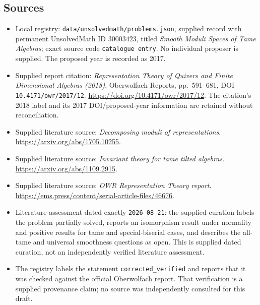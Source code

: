 \documentclass[11pt]{article}
\begin{document}
\subsection{Sources}
\begin{itemize}
\item Local registry: \texttt{data/unsolvedmath/problems.json}, supplied record with permanent UnsolvedMath ID \(30003423\), titled \emph{Smooth Moduli Spaces of Tame Algebras}; exact source code \texttt{catalogue entry}. No individual proposer is supplied. The proposed year is recorded as 2017.
\item Supplied report citation: \emph{Representation Theory of Quivers and Finite Dimensional Algebras (2018)}, Oberwolfach Reports, pp.~591--681, DOI \texttt{10.4171/owr/2017/12}. \url{https://doi.org/10.4171/owr/2017/12}. The citation's 2018 label and its 2017 DOI/proposed-year information are retained without reconciliation.
\item Supplied literature source: \emph{Decomposing moduli of representations}. \url{https://arxiv.org/abs/1705.10255}.
\item Supplied literature source: \emph{Invariant theory for tame tilted algebras}. \url{https://arxiv.org/abs/1109.2915}.
\item Supplied literature source: \emph{OWR Representation Theory report}. \url{https://ems.press/content/serial-article-files/46676}.
\item Literature assessment dated exactly \texttt{2026-08-21}: the supplied curation labels the problem partially solved, reports an isomorphism result under normality and positive results for tame and special-biserial cases, and describes the all-tame and universal smoothness questions as open. This is supplied dated curation, not an independently verified literature assessment.
\item The registry labels the statement \texttt{corrected\_verified} and reports that it was checked against the official Oberwolfach report. That verification is a supplied provenance claim; no source was independently consulted for this draft.
\end{itemize}
\end{document}
